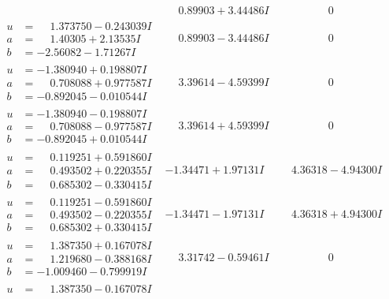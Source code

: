 \documentclass[1p]{elsarticle_modified}
\theoremstyle{definition}
\begin{document}
$$\begin{array}{c|c|c}
 & \phantom{-}0.89903 + 3.44486 I & \phantom{-0.000000 } 0 \\ \hline\begin{aligned}
u &= \phantom{-}1.373750 - 0.243039 I \\
a &= \phantom{-}1.40305 + 2.13535 I \\
b &= -2.56082 - 1.71267 I\end{aligned}
 & \phantom{-}0.89903 - 3.44486 I & \phantom{-0.000000 } 0 \\ \hline\begin{aligned}
u &= -1.380940 + 0.198807 I \\
a &= \phantom{-}0.708088 + 0.977587 I \\
b &= -0.892045 - 0.010544 I\end{aligned}
 & \phantom{-}3.39614 - 4.59399 I & \phantom{-0.000000 } 0 \\ \hline\begin{aligned}
u &= -1.380940 - 0.198807 I \\
a &= \phantom{-}0.708088 - 0.977587 I \\
b &= -0.892045 + 0.010544 I\end{aligned}
 & \phantom{-}3.39614 + 4.59399 I & \phantom{-0.000000 } 0 \\ \hline\begin{aligned}
u &= \phantom{-}0.119251 + 0.591860 I \\
a &= \phantom{-}0.493502 + 0.220355 I \\
b &= \phantom{-}0.685302 - 0.330415 I\end{aligned}
 & -1.34471 + 1.97131 I & \phantom{-}4.36318 - 4.94300 I \\ \hline\begin{aligned}
u &= \phantom{-}0.119251 - 0.591860 I \\
a &= \phantom{-}0.493502 - 0.220355 I \\
b &= \phantom{-}0.685302 + 0.330415 I\end{aligned}
 & -1.34471 - 1.97131 I & \phantom{-}4.36318 + 4.94300 I \\ \hline\begin{aligned}
u &= \phantom{-}1.387350 + 0.167078 I \\
a &= \phantom{-}1.219680 - 0.388168 I \\
b &= -1.009460 - 0.799919 I\end{aligned}
 & \phantom{-}3.31742 - 0.59461 I & \phantom{-0.000000 } 0 \\ \hline\begin{aligned}
u &= \phantom{-}1.387350 - 0.167078 I \\

\end{aligned}
\end{array}$$
\end{document}
